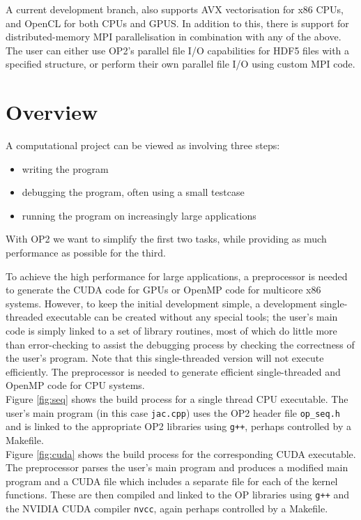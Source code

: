 \documentclass[11pt]{article}
\begin{document}
\noindent A current development branch, also supports AVX vectorisation for x86 CPUs, and OpenCL for both CPUs and
GPUS. In addition to this, there is support for distributed-memory MPI parallelisation in combination with any of the
above.  The user can either use OP2's parallel file I/O capabilities for HDF5 files with a specified structure, or
perform their own parallel file I/O using custom MPI code.

\newpage
\section{Overview}

A computational project can be viewed as involving three steps:
\begin{itemize}
\item
writing the program
\item
debugging the program, often using a small testcase
\item
running the program on increasingly large applications
\end{itemize}

\noindent With OP2 we want to simplify the first two tasks, while
providing as much performance as possible for the third.

To achieve the high performance for large applications, a
preprocessor is needed to generate the CUDA code for GPUs
or OpenMP code for multicore x86 systems.  However, to keep
the initial development simple, a development single-threaded executable
can be created without any special tools; the user's main code is simply
linked to a set of library routines, most of which do little
more than error-checking to assist the debugging process by
checking the correctness of the user's program.  Note that this
single-threaded version will not execute efficiently.  The
preprocessor is needed to generate efficient single-threaded and OpenMP code for
CPU systems.\\

\noindent Figure \ref{fig:seq} shows the build process for a single
thread CPU executable.  The user's main program (in this case
{\tt jac.cpp}) uses the OP2 header file {\tt op\_seq.h} and is
linked to the appropriate OP2 libraries using {\tt g++},
perhaps controlled by a Makefile.\\

\noindent Figure \ref{fig:cuda} shows the build process for the corresponding
CUDA executable.  The preprocessor parses the user's main program
and produces a modified main program and a CUDA file which
includes a separate file for each of the kernel functions.  These
are then compiled and linked to the OP libraries
using {\tt g++} and the NVIDIA CUDA compiler {\tt nvcc}, again
perhaps controlled by a Makefile.\\
\end{document}

